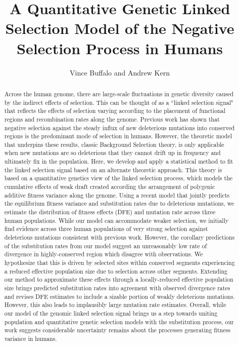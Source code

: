 \documentclass[11pt]{article}
\title{A Quantitative Genetic Linked Selection Model of the Negative Selection Process in Humans}
\author{Vince Buffalo and Andrew Kern}
\begin{document}
\maketitle

\begin{abstract}

    Across the human genome, there are large-scale fluctuations in genetic
    diversity caused by the indirect effects of selection. This can be thought
    of as a ``linked selection signal" that reflects the effects of selection
    varying according to the placement of functional regions and recombination
    rates along the genome. Previous work has shown that negative selection
    against the steady influx of new deleterious mutations into conserved
    regions is the predominant mode of selection in humans. However, the
    theoretic model that underpins these results, classic Background Selection
    theory, is only applicable when new mutations are so deleterious that they
    cannot drift up in frequency and ultimately fix in the population. Here, we
    develop and apply a statistical method to fit the linked selection signal
    based on an alternate theoretic approach. This theory is based on a
    quantitative genetics view of the linked selection process, which models
    the cumulative effects of weak draft created according the arrangement of
    polygenic additive fitness variance along the genome. Using a recent model
    that jointly predicts the equilibrium fitness variance and substitution
    rates due to deleterious mutations, we estimate the distribution of fitness
    effects (DFE) and mutation rate across three human populations. While our
    model can accommodate weaker selection, we initially find evidence across
    three human populations of very strong selection against deleterious
    mutations consistent with previous work. However, the corollary predictions
    of the substitution rates from our model suggest an unreasonably low rate
    of divergence in highly-conserved region which disagree with observations.
    We hypothesize that this is driven by selected sites within conserved
    segments experiencing a reduced effective population size due to selection
    across other segments. Extending our method to approximate these effects
    through a locally-reduced effective population size brings predicted
    substitution rates into agreement with observed divergence rates and
    revises DFE estimates to include a sizable portion of weakly deleterious
    mutations. However, this also leads to implausibly large mutation rate
    estimates. Overall, while our model of the genomic linked selection signal
    brings us a step towards uniting population and quantitative genetic
    selection models with the substitution process, our work suggests
    considerable uncertainty remains about the processes generating fitness
    variance in humans.
\end{abstract}
\end{document}
